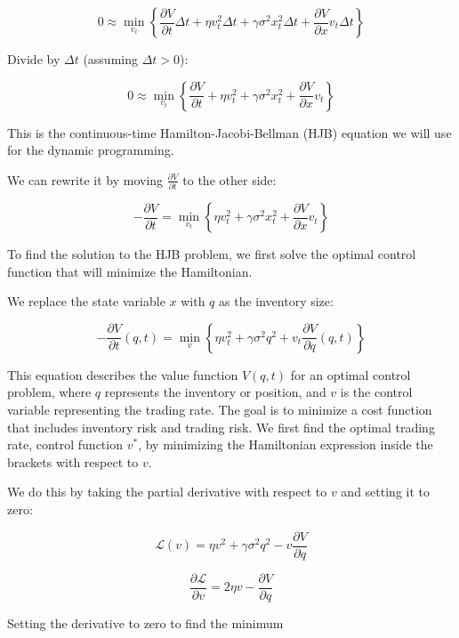 {$$0 \approx \min_{v_t} \left\{ \frac{\partial V}{\partial t} \Delta t + \eta v_t^2 \Delta t + \gamma \sigma^2 x_t^2 \Delta t + \frac{\partial V}{\partial x} v_t \Delta t \right\}$$

Divide by $\Delta t$ (assuming $\Delta t > 0$):

$$0 \approx \min_{v_t} \left\{ \frac{\partial V}{\partial t} + \eta v_t^2 + \gamma \sigma^2 x_t^2 + \frac{\partial V}{\partial x} v_t \right\}$$

This is the continuous-time Hamilton-Jacobi-Bellman (HJB) \cite{wiki:hamilton-jacobi-bellman} equation we will use for the dynamic programming.

We can rewrite it by moving $\frac{\partial V}{\partial t}$ to the other side:

\begin{equation}\label{eq:hjb_problem}
-\frac{\partial V}{\partial t} = \min_{v_t} \left\{ \eta v_t^2 + \gamma \sigma^2 x_t^2 + \frac{\partial V}{\partial x} v_t \right\}
\end{equation}

To find the solution to the HJB problem, we first solve the optimal control function that will minimize the Hamiltonian.

We replace the state variable $x$ with $q$ as the inventory size:

\begin{equation*}
-\frac{\partial V}{\partial t}(q,t) = \min_{v} \left\{ \eta v_t^2 + \gamma \sigma^2 q^2 + v_t \frac{\partial V}{\partial q}(q,t) \right\}
\end{equation*}

This equation describes the value function $V(q, t)$ for an optimal control problem, where $q$ represents the inventory or position, and  $v$ is the control variable representing the trading rate. The goal is to minimize a cost function that includes inventory risk and trading risk. We first find the optimal trading rate, control function $v^*$, by minimizing the Hamiltonian expression inside the brackets with respect to $v$. 

We do this by taking the partial derivative with respect to $v$ and setting it to zero:

$$\mathcal{L}(v) = \eta v^2 + \gamma \sigma^2 q^2 - v \frac{\partial V}{\partial q}$$

$$\frac{\partial \mathcal{L}}{\partial v} = 2 \eta v - \frac{\partial V}{\partial q}$$

Setting the derivative to zero to find the minimum

}
